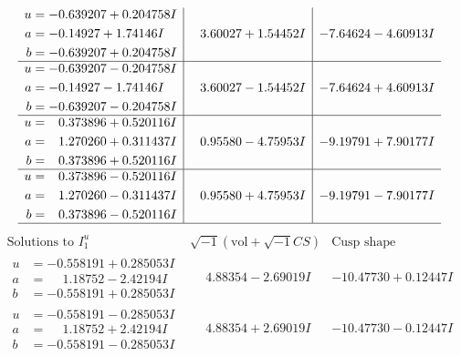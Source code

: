 \documentclass[1p]{elsarticle_modified}
\theoremstyle{definition}
\newcommand{\I}{\sqrt{-1}}
\begin{document}
$$\begin{array}{c|c|c}
\begin{aligned}
u &= -0.639207 + 0.204758 I \\
a &= -0.14927 + 1.74146 I \\
b &= -0.639207 + 0.204758 I\end{aligned}
 & \phantom{-}3.60027 + 1.54452 I & -7.64624 - 4.60913 I \\ \hline\begin{aligned}
u &= -0.639207 - 0.204758 I \\
a &= -0.14927 - 1.74146 I \\
b &= -0.639207 - 0.204758 I\end{aligned}
 & \phantom{-}3.60027 - 1.54452 I & -7.64624 + 4.60913 I \\ \hline\begin{aligned}
u &= \phantom{-}0.373896 + 0.520116 I \\
a &= \phantom{-}1.270260 + 0.311437 I \\
b &= \phantom{-}0.373896 + 0.520116 I\end{aligned}
 & \phantom{-}0.95580 - 4.75953 I & -9.19791 + 7.90177 I \\ \hline\begin{aligned}
u &= \phantom{-}0.373896 - 0.520116 I \\
a &= \phantom{-}1.270260 - 0.311437 I \\
b &= \phantom{-}0.373896 - 0.520116 I\end{aligned}
 & \phantom{-}0.95580 + 4.75953 I & -9.19791 - 7.90177 I\\
 \hline 
 \end{array}$$\newpage$$\begin{array}{c|c|c}  
\text{Solutions to }I^u_{1}& \I (\text{vol} + \sqrt{-1}CS) & \text{Cusp shape}\\
 \hline 
\begin{aligned}
u &= -0.558191 + 0.285053 I \\
a &= \phantom{-}1.18752 - 2.42194 I \\
b &= -0.558191 + 0.285053 I\end{aligned}
 & \phantom{-}4.88354 - 2.69019 I & -10.47730 + 0.12447 I \\ \hline\begin{aligned}
u &= -0.558191 - 0.285053 I \\
a &= \phantom{-}1.18752 + 2.42194 I \\
b &= -0.558191 - 0.285053 I\end{aligned}
 & \phantom{-}4.88354 + 2.69019 I & -10.47730 - 0.12447 I \\ \hline\begin{aligned}

\end{aligned}
\end{array}$$
\end{document}
